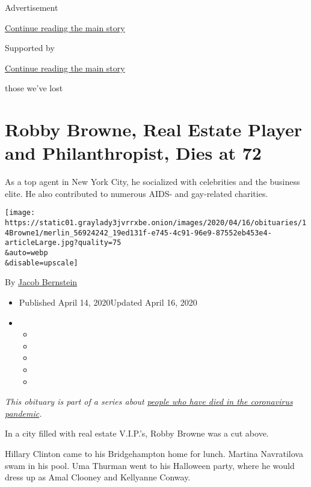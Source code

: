 Advertisement

\protect\hyperlink{after-top}{Continue reading the main story}

Supported by

\protect\hyperlink{after-sponsor}{Continue reading the main story}

those we've lost

\hypertarget{robby-browne-real-estate-player-and-philanthropist-dies-at-72}{%
\section{Robby Browne, Real Estate Player and Philanthropist, Dies at
72}\label{robby-browne-real-estate-player-and-philanthropist-dies-at-72}}

As a top agent in New York City, he socialized with celebrities and the
business elite. He also contributed to numerous AIDS- and gay-related
charities.

\texttt{[image: https://static01.graylady3jvrrxbe.onion/images/2020/04/16/obituaries/14Browne1/merlin\_56924242\_19ed131f-e745-4c91-96e9-87552eb453e4-articleLarge.jpg?quality=75\\\&auto=webp\\\&disable=upscale]}

By \href{https://www.nytimes3xbfgragh.onion/by/jacob-bernstein}{Jacob
Bernstein}

\begin{itemize}
\item
  Published April 14, 2020Updated April 16, 2020
\item
  \begin{itemize}
  \item
  \item
  \item
  \item
  \item
  \end{itemize}
\end{itemize}

\emph{This obituary is part of a series about}
\href{https://www.nytimes3xbfgragh.onion/series/people-who-have-died-of-the-coronavirus}{\emph{people
who have died in the coronavirus pandemic}}\emph{.}

In a city filled with real estate V.I.P.'s, Robby Browne was a cut
above.

Hillary Clinton came to his Bridgehampton home for lunch. Martina
Navratilova swam in his pool. Uma Thurman went to his Halloween party,
where he would dress up as Amal Clooney and Kellyanne Conway.

